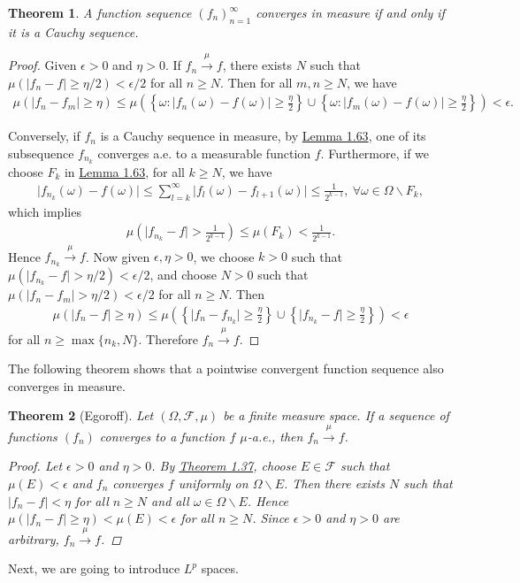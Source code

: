 \documentclass{article}
\numberwithin{equation}{section}
\theoremstyle{plain}
\newtheorem{theorem}{Theorem}[section]
\theoremstyle{definition}
\begin{document}
\begin{theorem}\label{thm:1.65} A function sequence $(f_n)_{n=1}^\infty$ converges in measure if and only if it is a Cauchy sequence.
\end{theorem}
\begin{proof}
Given $\epsilon>0$ and $\eta>0$. If $f_n\overset{\mu}{\to}f$,  there exists $N$ such that $\mu\left(\vert f_n-f\vert\geq\eta/2\right)<\epsilon/2$ for all $n\geq N$. Then for all $m,n\geq N$, we have
\begin{align*}
	\mu(\vert f_n-f_m\vert\geq\eta) \leq \mu\left(\left\{\omega:\vert f_n(\omega)-f(\omega)\vert\geq\frac{\eta}{2}\right\}\cup\left\{\omega:\vert f_m(\omega)-f(\omega)\vert\geq\frac{\eta}{2}\right\}\right) < \epsilon.
\end{align*}

Conversely, if $f_n$ is a Cauchy sequence in measure, by \hyperref[lemma:1.63]{Lemma 1.63}, one of its subsequence $f_{n_k}$ converges a.e. to a measurable function $f$. Furthermore, if we choose $F_k$ in \hyperref[lemma:1.63]{Lemma 1.63}, for all $k\geq N$, we have
\begin{align*}
	\vert f_{n_k}(\omega)-f(\omega)\vert \leq \sum_{l=k}^\infty\vert f_l(\omega)-f_{l+1}(\omega)\vert \leq \frac{1}{2^{k-1}},\ \forall\omega\in\Omega\backslash F_k,
\end{align*}
which implies
\begin{align*}
\mu\left(\vert f_{n_k}-f\vert > \frac{1}{2^{k-1}}\right) \leq \mu(F_k) < \frac{1}{2^{k-1}}.
\end{align*}
Hence $f_{n_k}\overset{\mu}{\to}f$. Now given $\epsilon,\eta>0$, we choose $k>0$ such that $\mu(\vert f_{n_k}-f\vert>\eta/2)<\epsilon/2$, and choose $N>0$ such that $\mu(\vert f_n-f_m\vert>\eta/2)<\epsilon/2$ for all $n\geq N$. Then
\begin{align*}
	\mu(\vert f_n-f\vert\geq \eta) \leq \mu\left(\left\{\vert f_n-f_{n_k}\vert\geq\frac{\eta}{2}\right\}\cup\left\{\vert f_{n_k}-f\vert\geq\frac{\eta}{2}\right\}\right) < \epsilon
\end{align*}
for all $n\geq\max\{n_k,N\}$. Therefore $f_n\overset{\mu}{\to} f$.
\end{proof}

The following theorem shows that a pointwise convergent function sequence also converges in measure.
\begin{theorem}[Egoroff]\label{thm:1.66} Let $(\Omega,\mathscr{F},\mu)$ be a finite measure space. If a sequence of functions $(f_n)$ converges to a function $f$ $\mu$-a.e., then $f_n\overset{\mu}{\to}f$.
\begin{proof}
Let $\epsilon>0$ and $\eta>0$. By \hyperref[thm:1.37]{Theorem 1.37}, choose $E\in\mathscr{F}$ such that $\mu(E)<\epsilon$ and $f_n$ converges $f$ uniformly on $\Omega\backslash E$. Then there exists $N$ such that $\vert f_n-f\vert < \eta$ for all $n\geq N$ and all $\omega\in\Omega\backslash E$. Hence $\mu(\vert f_n-f\vert\geq\eta) < \mu(E)<\epsilon$ for all $n\geq N$. Since $\epsilon>0$ and $\eta>0$ are arbitrary, $f_n\overset{\mu}{\to} f$.
\end{proof}
\end{theorem}
Next, we are going to introduce $L^p$ spaces. 
\end{document}
